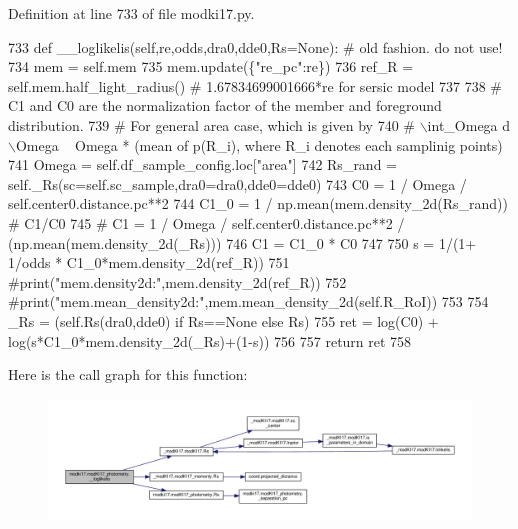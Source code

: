 Definition at line 733 of file modki17.\+py.


\begin{DoxyCode}
733     \textcolor{keyword}{def }\_\_loglikelis(self,re,odds,dra0,dde0,Rs=None): \textcolor{comment}{# old fashion. do not use!}
734         mem = self.mem
735         mem.update(\{\textcolor{stringliteral}{"re\_pc"}:re\})
736         ref\_R = self.mem.half\_light\_radius() \textcolor{comment}{# 1.67834699001666*re for sersic model}
737         
738         \textcolor{comment}{# C1 and C0 are the normalization factor of the member and foreground distribution.}
739         \textcolor{comment}{# For general area case, which is given by}
740         \textcolor{comment}{# \(\backslash\)int\_Omega d\(\backslash\)Omega ~ Omega * (mean of p(R\_i), where R\_i denotes each samplinig points) }
741         Omega = self.df\_sample\_config.loc[\textcolor{stringliteral}{"area"}]
742         Rs\_rand = self.\_Rs(sc=self.sc\_sample,dra0=dra0,dde0=dde0)
743         C0 = 1 / Omega / self.center0.distance.pc**2
744         C1\_0 = 1 / np.mean(mem.density\_2d(Rs\_rand)) \textcolor{comment}{# C1/C0}
745         \textcolor{comment}{# C1 = 1 / Omega / self.center0.distance.pc**2 / (np.mean(mem.density\_2d(\_Rs)))}
746         C1 = C1\_0 * C0
747         
750         s = 1/(1+ 1/odds * C1\_0*mem.density\_2d(ref\_R))
751         \textcolor{comment}{#print("mem.density2d:",mem.density\_2d(ref\_R))}
752         \textcolor{comment}{#print("mem.mean\_density2d:",mem.mean\_density\_2d(self.R\_RoI))}
753         
754         \_Rs = (self.Rs(dra0,dde0) \textcolor{keywordflow}{if} Rs==\textcolor{keywordtype}{None} \textcolor{keywordflow}{else} Rs)
755         ret = log(C0) + log(s*C1\_0*mem.density\_2d(\_Rs)+(1-s))
756 
757         \textcolor{keywordflow}{return} ret
758 
\end{DoxyCode}
Here is the call graph for this function\+:\nopagebreak
\begin{figure}[H]
\begin{center}
\leavevmode
\includegraphics[width=350pt]{dd/db2/classmodki17_1_1modKI17__photometry_a8e4f0338eabca2c723b6cf4148dec7a7_cgraph}
\end{center}
\end{figure}
\mbox{\label{classmodki17_1_1modKI17__photometry_af64d278fc0d7f4161dd13abf005ce8c8}} 
